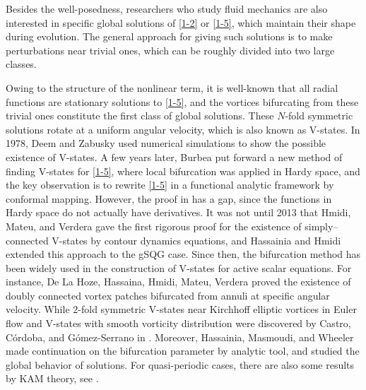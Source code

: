 \documentclass[12pt,reqno]{amsart}
\numberwithin{equation}{section}
\theoremstyle{definition}
\theoremstyle{remark}
\begin{document}
    
    Besides the well-posedness, researchers who study fluid mechanics are also interested in specific global solutions of \eqref{1-2} or \eqref{1-5}, 
    which maintain their shape during evolution. The general approach for giving such solutions is to make perturbations near trivial ones, 
    which can be roughly divided into two large classes. 
    
    Owing to the structure of the nonlinear term, it is well-known that all radial functions are stationary solutions to \eqref{1-5}, 
    and the vortices bifurcating from these trivial ones constitute the first class of global solutions. These $N$-fold symmetric solutions rotate at a uniform angular velocity, 
    which is also known as V-states. In 1978, Deem and Zabusky \cite{Deem} used numerical simulations to show the possible existence of V-states. 
    A few years later, Burbea \cite{Burb} put forward a new method of finding V-states for \eqref{1-5}, where local bifurcation was applied in Hardy space, 
    and the key observation is to rewrite \eqref{1-5} in a functional analytic framework by conformal mapping. 
    However, the proof in \cite{Burb} has a gap, since the functions in Hardy space do not actually have derivatives. It was not until 2013 
    that Hmidi, Mateu, and Verdera \cite{Hmi} gave the first rigorous proof for the existence of simply--connected V-states by contour dynamics equations, 
    and Hassainia and Hmidi \cite{Has} extended this approach to the gSQG case. Since then, the bifurcation method has been widely used in the construction
    of V-states for active scalar equations. For instance, De La Hoze, Hassaina, Hmidi, Mateu, Verdera \cite{de2} proved the existence of doubly connected 
    vortex patches bifurcated from annuli at specific angular velocity. While $2$-fold symmetric V-states near Kirchhoff elliptic vortices in Euler flow \cite{Kir} 
    and V-states with smooth vorticity distribution were discovered by Castro, C\'ordoba, and G\'omez-Serrano in \cite{Cas3}. 
    Moreover, Hassainia, Masmoudi, and Wheeler \cite{Has0} made continuation on the bifurcation parameter by analytic tool, and studied the global 
    behavior of solutions. For quasi-periodic cases, there are also some results by KAM theory, see \cite{BHM, HHM}.
    
\end{document}

